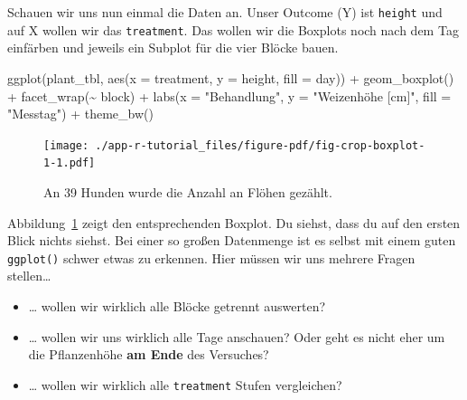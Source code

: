 \documentclass[
  letterpaper,
  DIV=11,
  oneside]{scrreport}
\newenvironment{Shaded}{\begin{snugshade}}{\end{snugshade}}
\newcommand{\AttributeTok}[1]{\textcolor[rgb]{0.40,0.45,0.13}{#1}}
\newcommand{\FunctionTok}[1]{\textcolor[rgb]{0.28,0.35,0.67}{#1}}
\newcommand{\NormalTok}[1]{\textcolor[rgb]{0.00,0.23,0.31}{#1}}
\newcommand{\SpecialCharTok}[1]{\textcolor[rgb]{0.37,0.37,0.37}{#1}}
\newcommand{\StringTok}[1]{\textcolor[rgb]{0.13,0.47,0.30}{#1}}
\providecommand{\tightlist}{%
  \setlength{\itemsep}{0pt}\setlength{\parskip}{0pt}}\usepackage{longtable,booktabs,array}
\begin{document}
Schauen wir uns nun einmal die Daten an. Unser Outcome (Y) ist
\texttt{height} und auf X wollen wir das \texttt{treatment}. Das wollen
wir die Boxplots noch nach dem Tag einfärben und jeweils ein Subplot für
die vier Blöcke bauen.

\begin{Shaded}
\begin{Highlighting}[]
\FunctionTok{ggplot}\NormalTok{(plant\_tbl, }\FunctionTok{aes}\NormalTok{(}\AttributeTok{x =}\NormalTok{ treatment, }\AttributeTok{y =}\NormalTok{ height, }\AttributeTok{fill =}\NormalTok{ day)) }\SpecialCharTok{+}
  \FunctionTok{geom\_boxplot}\NormalTok{() }\SpecialCharTok{+}
  \FunctionTok{facet\_wrap}\NormalTok{(}\SpecialCharTok{\textasciitilde{}}\NormalTok{ block) }\SpecialCharTok{+}
  \FunctionTok{labs}\NormalTok{(}\AttributeTok{x =} \StringTok{"Behandlung"}\NormalTok{, }\AttributeTok{y =} \StringTok{"Weizenhöhe [cm]"}\NormalTok{, }\AttributeTok{fill =} \StringTok{"Messtag"}\NormalTok{) }\SpecialCharTok{+}
  \FunctionTok{theme\_bw}\NormalTok{()}
\end{Highlighting}
\end{Shaded}

\begin{figure}[H]

{\centering \texttt{[image: ./app-r-tutorial\_files/figure-pdf/fig-crop-boxplot-1-1.pdf]}

}

\caption{\label{fig-crop-boxplot-1}An 39 Hunden wurde die Anzahl an
Flöhen gezählt.}

\end{figure}

Abbildung~\ref{fig-crop-boxplot-1} zeigt den entsprechenden Boxplot. Du
siehst, dass du auf den ersten Blick nichts siehst. Bei einer so großen
Datenmenge ist es selbst mit einem guten \texttt{ggplot()} schwer etwas
zu erkennen. Hier müssen wir uns mehrere Fragen stellen\ldots{}

\begin{itemize}
\tightlist
\item
  \ldots{} wollen wir wirklich alle Blöcke getrennt auswerten?
\item
  \ldots{} wollen wir uns wirklich alle Tage anschauen? Oder geht es
  nicht eher um die Pflanzenhöhe \textbf{am Ende} des Versuches?
\item
  \ldots{} wollen wir wirklich alle \texttt{treatment} Stufen
  vergleichen?
\end{itemize}
\end{document}
